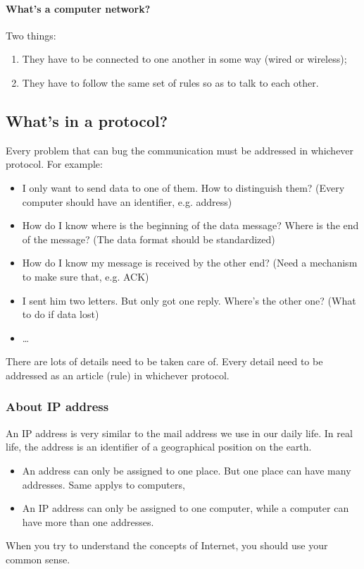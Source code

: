 \documentclass{article}
\begin{document}
\paragraph{What's a computer network?}

Two things:
\begin{enumerate}
\item They have to be connected to one another in some way (wired or wireless);
\item They have to follow the same set of rules so as to talk to each other.
\end{enumerate}

\subsection{What's in a protocol?}
\label{sec:whats-in-protocol}

Every problem that can bug the communication must be addressed in whichever
protocol. For example:
\begin{itemize}
\item I only want to send data to one of them. How to distinguish them? (Every computer
  should have an identifier, e.g. address)
\item How do I know where is the beginning of the data message? Where is the end of the message?
  (The data format should be standardized)
\item How do I know my message is received by the other end? (Need a mechanism to make
  sure that, e.g. ACK)
\item I sent him two letters. But only got one reply. Where's the other one? (What to do
  if data lost)
\item \ldots
\end{itemize}

There are lots of details need to be taken care of. Every detail need to be addressed as
an article (rule) in whichever protocol.  

\subsubsection{About IP address}
\label{sec:about-ip-address}

An IP address is very similar to the mail address we use in our daily life. In real life,
the address is an identifier of a geographical position on the earth.
\begin{itemize}
\item An address can only be assigned to one place. But one place can have many
  addresses. Same applys to computers,
\item An IP address can only be assigned to one computer, while a computer can have more
  than one addresses.
\end{itemize}
When you try to understand the concepts of Internet, you should use your common sense. 
\end{document}
